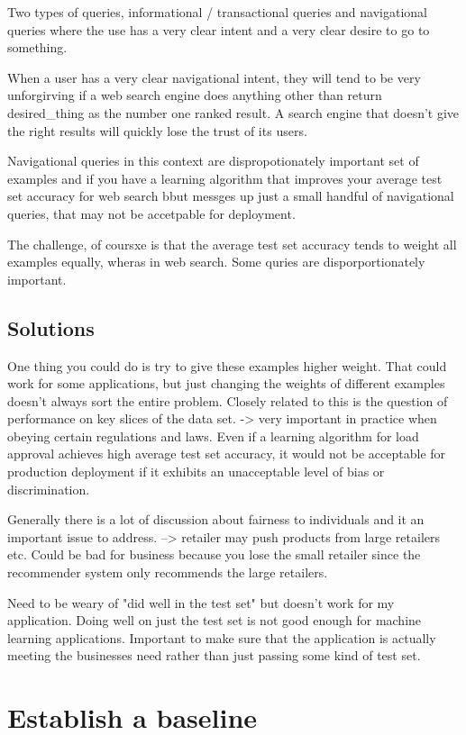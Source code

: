 Two types of queries, informational / transactional queries and navigational queries where the use has a very clear intent and a very clear desire to go to something.

When a user has a very clear navigational intent, they will tend to be very unforgirving if a web search engine does anything other than return desired_thing as the number one ranked result.
A search engine that doesn't give the right results will quickly lose the trust of its users.

Navigational queries in this context are dispropotionately important set of examples and if you have a learning algorithm that improves your average test set accuracy for web search bbut messges up just a small handful of navigational queries, that may not be accetpable for deployment.

The challenge, of coursxe is that the average test set accuracy tends to weight all examples equally, wheras in web search. Some quries are disporportionately important.



\subsection{Solutions}
One thing you could do is try to give these examples higher weight.
That could work for some applications, but just changing the weights of different examples doesn't always sort the entire problem.
Closely related to this is the question of performance on key slices of the data set.
-> very important in practice when obeying certain regulations and laws.
Even if a learning algorithm for load approval achieves high average test set accuracy, it would not be acceptable for production deployment if it exhibits an unacceptable level of bias or discrimination.

Generally there is a lot of discussion about fairness to individuals and it an important issue to address.
--> retailer may push products from large retailers etc.
Could be bad for business because you lose the small retailer since the recommender system only recommends the large retailers.

Need to be weary of "did well in the test set" but doesn't work for my application.
Doing well on just the test set is not good enough for machine learning applications.
Important to make sure that the application is actually meeting the businesses need rather than just passing some kind of test set.

\section{Establish a baseline}

